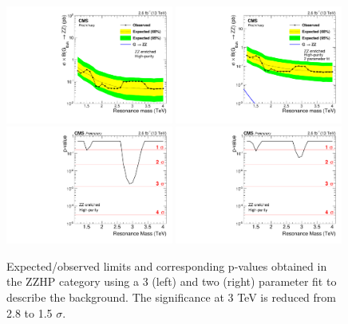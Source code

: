 \begin{figure}[h!]
\centering
\includegraphics[width=0.49\textwidth]{figures/analysis/search1/AN-15-211/limits/brazilianFlag_BulkZZ_ZZHP_13TeV.pdf}
\includegraphics[width=0.49\textwidth]{figures/analysis/search1/AN-15-211/limits/brazilianFlag_BulkZZ_ZZHP_2parFit__13TeV.pdf}\\
\includegraphics[width=0.49\textwidth]{figures/analysis/search1/AN-15-211/pvalues/pvalue_BulkZZinZZ_high_purity.pdf}
\includegraphics[width=0.49\textwidth]{figures/analysis/search1/AN-15-211/pvalues/pvalue_BulkZZinZZ_high_purity_2par.pdf}
\caption{Expected/observed limits and corresponding p-values obtained in the ZZHP category using a 3 (left) and two (right) parameter fit to describe the background. The significance at 3 TeV is reduced from 2.8 to 1.5 $\sigma$.}
\label{fig:searchI:Limits_ZZHP}
\end{figure}

